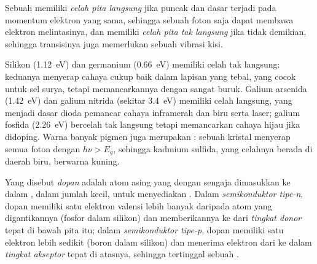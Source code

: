 \begin{definition}\label{def:b3:solid-state:gap-types}
Sebuah  memiliki \emph{celah pita langsung} jika
puncak  dan dasar  terjadi pada momentum elektron yang
sama, sehingga sebuah foton saja dapat membawa elektron melintasinya, dan memiliki
\emph{celah pita tak langsung} jika tidak demikian, sehingga
transisinya juga memerlukan sebuah vibrasi kisi.
\end{definition}

Silikon (\qty{1.12}{eV}) dan germanium (\qty{0.66}{eV}) memiliki celah tak langsung:
keduanya menyerap cahaya cukup baik dalam lapisan yang tebal, yang cocok untuk sel surya, tetapi
memancarkannya dengan sangat buruk. Galium arsenida (\qty{1.42}{eV}) dan galium nitrida (sekitar
\qty{3.4}{eV}) memiliki celah langsung, yang menjadi dasar dioda pemancar cahaya inframerah dan biru
serta laser; galium fosfida (\qty{2.26}{eV}) bercelah tak langsung tetapi memancarkan cahaya hijau
jika didoping. Warna banyak pigmen juga merupakan : sebuah kristal
menyerap semua foton dengan $h\nu > E_g$, sehingga kadmium sulfida, yang celahnya berada di daerah biru,
berwarna kuning.

\begin{definition}[Doping]\label{def:b3:solid-state:doping}
Yang disebut \emph{dopan} adalah atom asing yang dengan sengaja dimasukkan ke dalam ,
dalam jumlah kecil, untuk menyediakan . Dalam \emph{semikonduktor
tipe-n}, dopan memiliki satu elektron valensi lebih banyak
daripada atom yang digantikannya (fosfor dalam silikon) dan memberikannya ke
 dari \emph{tingkat donor} tepat di bawah pita
itu; dalam \emph{semikonduktor tipe-p}, dopan memiliki satu elektron
lebih sedikit (boron dalam silikon) dan menerima elektron dari  ke dalam
\emph{tingkat akseptor} tepat di atasnya, sehingga tertinggal sebuah .
\end{definition}

